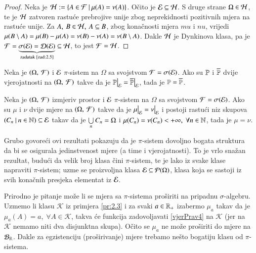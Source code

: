 \begin{proof}
    Neka je $\mathcal{H} := \{{A \in \mathcal{F}} \: | \: {\mu({A}) = \nu(A)}\}$.
    O\v cito je $\mathcal{E} \subseteq \mathcal{H}$. S druge strane $\Omega \in \mathcal{H}$,
    te je $\mathcal{H}$ zatvoren rastu\' ce prebrojive unije zbog
    neprekidnosti pozitivnih mjera na rastu\' ce unije.
    Za $A, \: B \in \mathcal{H}, \: A \subseteq B$, zbog kona\v cnosti mjera
    $mu$ i $nu$, vrijedi $\mu({B \setminus A}) = \mu({B})
    - \mu({A}) = \nu(B) - \nu(A) = \nu(B \setminus A)$.
    Dakle $\mathcal{H}$ je Dynkinova klasa, pa je $\mathcal{F} = \underbrace{
    \sigma({\mathcal{E}}) = \mathcal{D}({\mathcal{E}})}_{\textnormal{zadatak \ref{zad:2.5}}}
    \subseteq \mathcal{H}$, to jest $\mathcal{F} = \mathcal{H}$.
\end{proof}

\begin{kor} \label{kor:2.7}
    Neka je $(\Omega, \: \mathcal{F})$ i $\mathcal{E}$ $\pi$-sistem na $\Omega$ sa
    svojstvom $\mathcal{F} = \sigma({\mathcal{E}})$. Ako su $\mathbb{P}$ i $\overline{\mathbb{P}}$
    dvije vjerojatnosti na $(\Omega, \: \mathcal{F})$ takve da je
    $\restr{\Pp}{\E} = \restr{\overline{\Pp}}{\E}$, tada je $\mathbb{P}
    = \overline{\mathbb{P}}$.
\end{kor}

\begin{zad} \label{zad:2.9}
    Neka je $(\Omega, \: \mathcal{F})$ izmjeriv prostor i $\mathcal{E}$ $\pi$-sistem
    na $\Omega$ sa svojstvom $\mathcal{F} = \sigma({\mathcal{E}})$.
    Ako su $\mu$ i $\nu$ dvije mjere na $(\Omega, \: \mathcal{F})$ takve
    da je $\restr{\mu}{\E} = \restr{\nu}{\E}$ i postoji rastu\' ci
    niz skupova $({C_n} \: | \: {n \in \mathbb{N}}) \subseteq \mathcal{E}$ takav da je
    $\bigcup\limits_{n}^{}C_n = \Omega$ i $\mu({C_n}) = \nu(C_n) < +\infty, \;
    \forall n \in \mathbb{N}$, tada je $\mu = \nu$.
\end{zad}

\begin{nap} \label{nap:2.10}
    Grubo govore\' ci ovi rezultati pokazuju da je $\pi$-sistem
    dovoljno bogata struktura da bi se osigurala jedinstvenost mjere
    (a time i vjerojatnosti). To je vrlo sna\v zan rezultat,
    budu\' ci da velik broj klasa \v cini $\pi$-sistem, te je lako iz
    svake klase napraviti $\pi$-sistem; uzme se proizvoljna klasa
    $\mathcal{E} \subseteq \mathcal{P}({\Omega})$, klasa koja se sastoji iz svih
    kona\v cnih presjeka elementat iz $\mathcal{E}$.

    Prirodno je pitanje mo\v ze li se mjera sa $\pi$-sistema
    pro\v siriti na pripadnu $\sigma$-algebru. Uzmemo li klasu
    $\mathcal{K}$ iz primjera \ref{pr:2.3} i za svaki $a \in \mathbb{R}_+$
    izabermo $\mu_a$ takav da je $\mu_a(A) = a, \; \forall A \in
    \mathcal{K}$, takva \' ce funkcija zadovoljavati
    \eqref{vjerPrav4} na $\mathcal{K}$ (jer na $\mathcal{K}$ nemamo
    niti dva disjunktna skupa). O\v cito se $\mu_a$ ne mo\v ze
    pro\v siriti do mjere na $\mathcal{B}_{\mathbb{R}}$.
    Dakle za egzistenciju  (pro\v sirivanje) mjere trebamo ne\v sto
    bogatiju klasu od $\pi$-sistema.
\end{nap}

